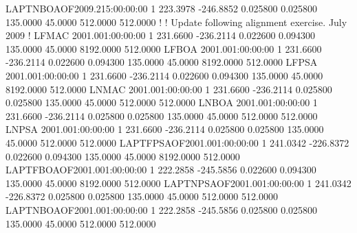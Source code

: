 LAPTNBOAOF2009.215:00:00:00  1    223.3978   -246.8852    0.025800    0.025800    135.0000     45.0000    512.0000    512.0000
!
! Update following alignment exercise. July 2009
!
LFMAC     2001.001:00:00:00  1    231.6600   -236.2114    0.022600    0.094300    135.0000     45.0000   8192.0000    512.0000
LFBOA     2001.001:00:00:00  1    231.6600   -236.2114    0.022600    0.094300    135.0000     45.0000   8192.0000    512.0000
LFPSA     2001.001:00:00:00  1    231.6600   -236.2114    0.022600    0.094300    135.0000     45.0000   8192.0000    512.0000
LNMAC     2001.001:00:00:00  1    231.6600   -236.2114    0.025800    0.025800    135.0000     45.0000    512.0000    512.0000
LNBOA     2001.001:00:00:00  1    231.6600   -236.2114    0.025800    0.025800    135.0000     45.0000    512.0000    512.0000
LNPSA     2001.001:00:00:00  1    231.6600   -236.2114    0.025800    0.025800    135.0000     45.0000    512.0000    512.0000
LAPTFPSAOF2001.001:00:00:00  1    241.0342   -226.8372    0.022600    0.094300    135.0000     45.0000   8192.0000    512.0000
LAPTFBOAOF2001.001:00:00:00  1    222.2858   -245.5856    0.022600    0.094300    135.0000     45.0000   8192.0000    512.0000
LAPTNPSAOF2001.001:00:00:00  1    241.0342   -226.8372    0.025800    0.025800    135.0000     45.0000    512.0000    512.0000
LAPTNBOAOF2001.001:00:00:00  1    222.2858   -245.5856    0.025800    0.025800    135.0000     45.0000    512.0000    512.0000
